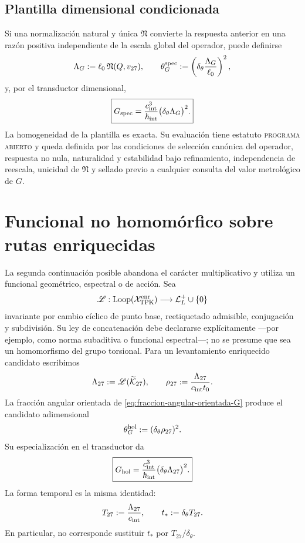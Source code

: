 \subsection{Plantilla dimensional condicionada}

Si una normalización natural y única \(\mathfrak N\) convierte la respuesta
anterior en una razón positiva independiente de la escala global del
operador, puede definirse
\[
 \Lambda_G
 :=\ell_0\,\mathfrak N(Q,v_{27}),
 \qquad
 \theta_G^{\rm spec}
 :=
 \left(
 \delta_\theta\frac{\Lambda_G}{\ell_0}
 \right)^2,
\]
y, por el transductor dimensional,
\[
 \boxed{
 G_{\rm spec}
 =
 \frac{c_{\rm int}^{3}}{\hbar_{\rm int}}
 \bigl(\delta_\theta\Lambda_G\bigr)^2.}
\]
La homogeneidad de la plantilla es exacta. Su evaluación tiene estatuto
\textsc{programa abierto} y queda definida por las condiciones de selección
canónica del operador, respuesta no nula, naturalidad y estabilidad bajo
refinamiento, independencia de reescala, unicidad de \(\mathfrak N\) y
sellado previo a cualquier consulta del valor metrológico de \(G\).

\section{Funcional no homomórfico sobre rutas enriquecidas}
\label{sec:funcional-longitud-K27-G}

La segunda continuación posible abandona el carácter multiplicativo y utiliza
un funcional geométrico, espectral o de acción. Sea
\[
 \mathscr L:
 \operatorname{Loop}(\mathcal X_{\rm TPK}^{\rm enr})
 \longrightarrow\mathcal L_L^+\cup\{0\}
\]
invariante por cambio cíclico de punto base, reetiquetado admisible,
conjugación y subdivisión. Su ley de concatenación debe declararse
explícitamente ---por ejemplo, como norma subaditiva o funcional espectral---;
no se presume que sea un homomorfismo del grupo torsional. Para un
levantamiento enriquecido candidato escribimos
\[
 \Lambda_{27}:=\mathscr L(\widetilde{\mathcal K}_{27}),
 \qquad
 \rho_{27}:=\frac{\Lambda_{27}}{c_{\rm int}t_0}.
\]
La fracción angular orientada de
\eqref{eq:fraccion-angular-orientada-G} produce el candidato adimensional
\[
 \theta_G^{\rm hol}:=(\delta_\theta\rho_{27})^2.
\]
Su especialización en el transductor da
\[
 \boxed{
 G_{\rm hol}
 =\frac{c_{\rm int}^{3}}{\hbar_{\rm int}}
  \bigl(\delta_\theta\Lambda_{27}\bigr)^2.}
\]
La forma temporal es la misma identidad:
\[
 T_{27}:=\frac{\Lambda_{27}}{c_{\rm int}},
 \qquad
 t_\ast:=\delta_\theta T_{27}.
\]
En particular, no corresponde sustituir \(t_\ast\) por
\(T_{27}/\delta_\theta\).

